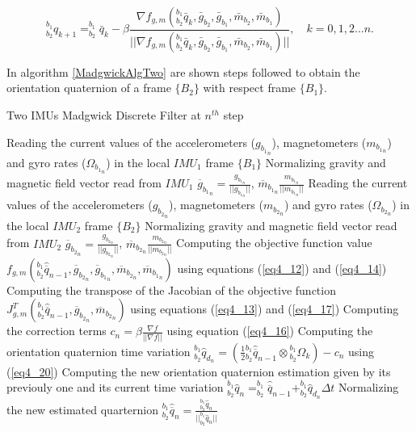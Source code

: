 \begin{equation}
\label{eq4_22}
^{b_1}_{b_2} q_{k+1} = ^{b_1}_{b_2} \bar{q}_k - \beta \frac{\nabla f_{g,m}(^{b_1}_{b_2} \bar{q}_k,\bar{g}_{b_2},\bar{g}_{b_1},\bar{m}_{b_2},\bar{m}_{b_1}) }{\vert \vert \nabla f_{g,m}(^{b_1}_{b_2} \bar{q}_k,\bar{g}_{b_2},\bar{g}_{b_1},\bar{m}_{b_2},\bar{m}_{b_1})  \vert \vert}, \quad k = 0,1,2 \dots n.
\end{equation} 

In algorithm \ref{MadgwickAlgTwo} are shown steps followed to obtain the orientation quaternion of a frame $\{ B_2 \}$ with respect frame $\{ B_1 \}$. 

\begin{algorithm}
\caption{Two IMUs Madgwick Discrete Filter at $n^{th}$ step}
\begin{algorithmic}[1]
\label{MadgwickAlgTwo}
\STATE Reading the current values of the accelerometers ($g_{{b_1}_n}$), magnetometers ($m_{{b_1}_n}$) and gyro rates ($\Omega_{{b_1}_n}$) in the local $IMU_1$ frame $\{B_1\}$
\STATE Normalizing gravity and magnetic field vector read from $IMU_1$ $\overline{g}_{{b_1}_n} = \frac{g_{{b_1}_n}}{\vert \vert g_{{b_1}_n} \vert \vert}$, $\overline{m}_{{b_1}_n} \frac{m_{{b_1}_n}}{\vert \vert m_{{b_1}_n} \vert \vert}$
\STATE Reading the current values of the accelerometers ($g_{{b_2}_n}$), magnetometers ($m_{{b_2}_n}$) and gyro rates ($\Omega_{{b_2}_n}$) in the local $IMU_2$ frame $\{B_2\}$
\STATE Normalizing gravity and magnetic field vector read from $IMU_2$ $\overline{g}_{{b_2}_n} = \frac{g_{{b_2}_n}}{\vert \vert g_{{b_2}_n} \vert \vert}$, $\overline{m}_{{b_2}_n} \frac{m_{{b_2}_n}}{\vert \vert m_{{b_2}_n} \vert \vert}$
\STATE Computing the objective function value $f_{g,m}({^{b_1}_{b_2}\hat{\overline{q}}_{n-1}},\overline{g}_{{b_2}_n},\overline{g}_{{b_1}_n},\overline{m}_{{b_2}_n},\overline{m}_{{b_1}_n})$ using equations (\ref{eq4_12}) and (\ref{eq4_14})
\STATE Computing the transpose of the Jacobian of the objective function $J^T_{g,m}(^{b_1}_{b_2}\hat{\overline{q}}_{n-1},\overline{g}_{{b_2}_n},\overline{m}_{{b_2}_n})$ using equations (\ref{eq4_13}) and (\ref{eq4_17})
\STATE Computing the correction terms $c_n =  \beta \frac{\nabla f}{\vert \vert \nabla f \vert \vert}$ using equation (\ref{eq4_16})
\STATE Computing the orientation quaternion time variation $^{b_1}_{b_2} \hat{q}_{d_n} =  (\frac{1}{2} {^{b_1}_{b_2}\hat{\overline{q}}_{n-1}} \otimes {^{b_1}_{b_2} \Omega_k}) - c_n$ using (\ref{eq4_20})
\STATE Computing the new orientation quaternion estimation given by its previouly one and its current time variation $^{b_1}_{b_2} \hat{q}_n = ^{b_1}_{b_2}\hat{\overline{q}}_{n-1} + ^{b_1}_{b_2} \hat{q}_{d_n} \Delta t$
\STATE Normalizing the new estimated quarternion $^{b_1}_{b_2} \hat{\overline{q}}_n = \frac{^{b_1}_{b_2} \hat{q}_n}{\vert \vert ^{b_1}_{b_2} \hat{q}_n \vert \vert}$ 
\end{algorithmic}
\end{algorithm}

